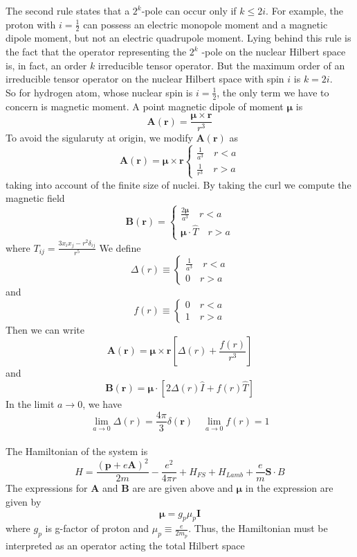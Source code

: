 The second rule states that a $2^k$-pole can occur only if $k \leq 2i$. For example, the proton with $i = \frac{1}{2}$ can possess an electric monopole moment and a magnetic dipole moment, but not an electric quadrupole moment. Lying behind this rule is the fact that the operator representing the $2^k$ -pole on the nuclear Hilbert space is, in fact, an order $k$ irreducible tensor operator. But the maximum order of an irreducible tensor operator on the nuclear Hilbert space with
spin $i$ is $k = 2i$.\\
So for hydrogen atom, whose nuclear spin is $i = \frac{1}{2}$, the only term we have to concern is magnetic moment. A point magnetic dipole of moment $\bm{\mu}$ is
\[\bm{A}(\bm{r}) = \frac{\bm{\mu}\times\bm{r}}{r^3}\]
To avoid the sigularuty at origin, we modify $\bm{A}(\bm{r})$ as
\[\bm{A}(\bm{r}) = \bm{\mu}\times\bm{r} \begin{cases} \frac{1}{a^3} \quad r < a\\ \frac{1}{r^3} \quad r > a\end{cases} \]
taking into account of the finite size of nuclei. 
By taking the curl we compute the magnetic field
\[\bm{B}(\bm{r}) =  \begin{cases} \frac{2\bm{\mu}}{a^3} \quad r < a\\ \bm{\mu}\cdot\hat{T} \quad r > a\end{cases} \]
where $T_{ij} = \frac{3x_ix_j-r^2\delta_{ij}}{r^5}$
We define
\[\Delta(r) \equiv \begin{cases} \frac{1}{a^3} \quad r < a\\ 0 \quad r > a\end{cases}\]
and
\[f(r) \equiv \begin{cases} 0 \quad r < a\\ 1 \quad r > a\end{cases}\]
Then we can write
\[\bm{A}(\bm{r}) = \bm{\mu}\times\bm{r} \left [\Delta(r) + \frac{f(r)}{r^3}\right ] \]
and
\[\bm{B}(\bm{r}) = \bm{\mu}\cdot \left [2\Delta(r)\hat{I} + f(r)\hat{T}\right ] \]
In the limit $a \to 0$, we have
\[\lim_{a \to 0} \Delta(r) = \frac{4\pi}{3}\delta(\bm{r}) \quad \lim_{a \to 0} f(r) = 1\]\\
The Hamiltonian of the system is
\[H = \frac{(\bm{p}+e\bm{A})^2}{2m} - \frac{e^2}{4\pi r} + H_{FS} + H_{Lamb} + \frac{e}{m}\bm{S}\cdot{B}\]
The expressions  for $\bm{A}$ and $\bm{B}$ are are given above and $\bm{\mu}$ in the expression are given by
\[\bm{\mu} = g_{p} \mu_p \bm{I}\]
where $g_p$ is g-factor of proton and $\mu_p \equiv \frac{e}{2m_p}$. Thus, the Hamiltonian must be interpreted as an operator acting the total Hilbert space
